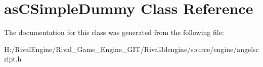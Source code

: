 \hypertarget{classas_c_simple_dummy}{}\section{as\+C\+Simple\+Dummy Class Reference}
\label{classas_c_simple_dummy}


The documentation for this class was generated from the following file\+:\begin{DoxyCompactItemize}
\item 
H\+:/\+Rival\+Engine/\+Rival\+\_\+\+Game\+\_\+\+Engine\+\_\+\+G\+I\+T/\+Rival3dengine/source/engine/angelscript.\+h\end{DoxyCompactItemize}
